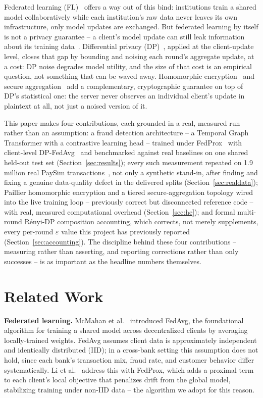 \documentclass[12pt]{svproc}
\begin{document}
Federated learning (FL)~\cite{mcmahan2017fedavg} offers a way out of
this bind: institutions train a shared model collaboratively while each
institution's raw data never leaves its own infrastructure, only model
updates are exchanged. But federated learning by itself is not a privacy
guarantee -- a client's model update can still leak information about
its training data~\cite{mcmahan2018dp,abadi2016dpsgd}. Differential
privacy (DP)~\cite{dwork2014dp}, applied at the client-update level,
closes that gap by bounding and noising each round's aggregate update,
at a cost: DP noise degrades model utility, and the size of that cost is
an empirical question, not something that can be waved away. Homomorphic
encryption~\cite{paillier1999} and secure aggregation~\cite{bonawitz2017secagg}
add a complementary, cryptographic guarantee on top of DP's statistical
one: the server never observes an individual client's update in
plaintext at all, not just a noised version of it.

This paper makes four contributions, each grounded in a real, measured
run rather than an assumption: a fraud detection architecture -- a
Temporal Graph Transformer with a contrastive learning head -- trained
under FedProx~\cite{li2020fedprox} with client-level
DP-FedAvg~\cite{mcmahan2018dp} and benchmarked against real baselines
on one shared held-out test set (Section~\ref{sec:results}); every such
measurement repeated on 1.9 million real PaySim
transactions~\cite{lopezrojas2016paysim}, not only a synthetic
stand-in, after finding and fixing a genuine data-quality defect in the
delivered splits (Section~\ref{sec:realdata}); Paillier homomorphic
encryption and a tiered secure-aggregation topology wired into the live
training loop -- previously correct but disconnected reference code --
with real, measured computational overhead (Section~\ref{sec:he}); and
formal multi-round R\'enyi-DP composition accounting, which corrects,
not merely supplements, every per-round $\varepsilon$ value this
project has previously reported (Section~\ref{sec:accounting}). The
discipline behind these four contributions -- measuring rather than
asserting, and reporting corrections rather than only successes -- is
as important as the headline numbers themselves.

\section{Related Work}

\textbf{Federated learning.} McMahan et al.~\cite{mcmahan2017fedavg}
introduced FedAvg, the foundational algorithm for training a shared
model across decentralized clients by averaging locally-trained weights.
FedAvg assumes client data is approximately independent and identically
distributed (IID); in a cross-bank setting this assumption does not
hold, since each bank's transaction mix, fraud rate, and customer
behavior differ systematically. Li et al.~\cite{li2020fedprox} address
this with FedProx, which adds a proximal term to each client's local
objective that penalizes drift from the global model, stabilizing
training under non-IID data -- the algorithm we adopt for this reason.
\end{document}
